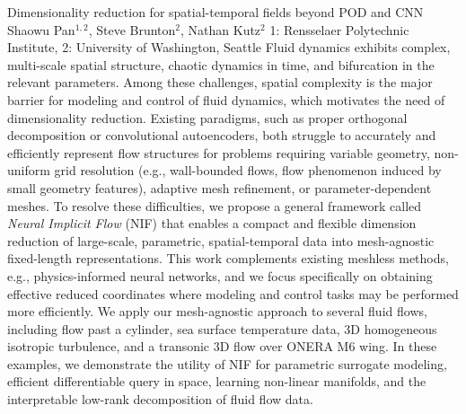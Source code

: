 \vspace{1.5ex}
\abs
{Dimensionality reduction for spatial-temporal fields beyond POD and CNN}
{Shaowu Pan$^{1,2}$, Steve Brunton$^{2}$, Nathan Kutz$^{2}$}
{1: Rensselaer Polytechnic Institute, 2: University of Washington, Seattle}
{Fluid dynamics exhibits complex, multi-scale spatial structure, chaotic dynamics in time, and bifurcation in the relevant parameters. Among these challenges, spatial complexity is the major barrier for modeling and control of fluid dynamics, which motivates the need of dimensionality reduction. Existing paradigms, such as proper orthogonal decomposition or convolutional autoencoders, both struggle to accurately and efficiently represent flow structures for problems requiring variable geometry, non-uniform grid resolution (e.g., wall-bounded flows, flow phenomenon induced by small geometry features), adaptive mesh refinement, or parameter-dependent meshes. To resolve these difficulties, we propose a general framework called \textit{Neural Implicit Flow} (NIF) that enables a compact and flexible dimension reduction of large-scale, parametric, spatial-temporal data into mesh-agnostic fixed-length representations. This work complements existing meshless methods, e.g., physics-informed neural networks, and we focus specifically on obtaining effective reduced coordinates where modeling and control tasks may be performed more efficiently. We apply our mesh-agnostic approach to several fluid flows, including flow past a cylinder, sea surface temperature data, 3D homogeneous isotropic turbulence, and a transonic 3D flow over ONERA M6 wing. In these examples, we demonstrate the utility of NIF for parametric surrogate modeling, efficient differentiable query in space, learning non-linear manifolds, and the interpretable low-rank decomposition of fluid flow data.}


